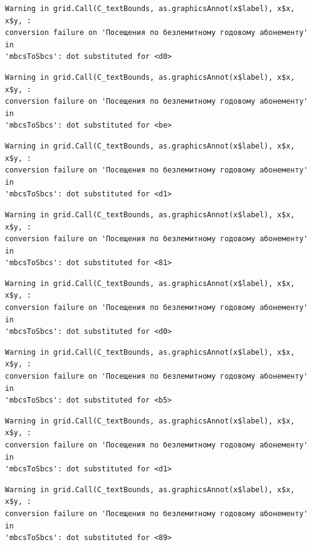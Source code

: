 \documentclass[
  letterpaper,
  DIV=11,
  numbers=noendperiod]{scrartcl}
\begin{document}
\begin{verbatim}
Warning in grid.Call(C_textBounds, as.graphicsAnnot(x$label), x$x, x$y, :
conversion failure on 'Посещения по безлемитному годовому абонементу' in
'mbcsToSbcs': dot substituted for <d0>
\end{verbatim}

\begin{verbatim}
Warning in grid.Call(C_textBounds, as.graphicsAnnot(x$label), x$x, x$y, :
conversion failure on 'Посещения по безлемитному годовому абонементу' in
'mbcsToSbcs': dot substituted for <be>
\end{verbatim}

\begin{verbatim}
Warning in grid.Call(C_textBounds, as.graphicsAnnot(x$label), x$x, x$y, :
conversion failure on 'Посещения по безлемитному годовому абонементу' in
'mbcsToSbcs': dot substituted for <d1>
\end{verbatim}

\begin{verbatim}
Warning in grid.Call(C_textBounds, as.graphicsAnnot(x$label), x$x, x$y, :
conversion failure on 'Посещения по безлемитному годовому абонементу' in
'mbcsToSbcs': dot substituted for <81>
\end{verbatim}

\begin{verbatim}
Warning in grid.Call(C_textBounds, as.graphicsAnnot(x$label), x$x, x$y, :
conversion failure on 'Посещения по безлемитному годовому абонементу' in
'mbcsToSbcs': dot substituted for <d0>
\end{verbatim}

\begin{verbatim}
Warning in grid.Call(C_textBounds, as.graphicsAnnot(x$label), x$x, x$y, :
conversion failure on 'Посещения по безлемитному годовому абонементу' in
'mbcsToSbcs': dot substituted for <b5>
\end{verbatim}

\begin{verbatim}
Warning in grid.Call(C_textBounds, as.graphicsAnnot(x$label), x$x, x$y, :
conversion failure on 'Посещения по безлемитному годовому абонементу' in
'mbcsToSbcs': dot substituted for <d1>
\end{verbatim}

\begin{verbatim}
Warning in grid.Call(C_textBounds, as.graphicsAnnot(x$label), x$x, x$y, :
conversion failure on 'Посещения по безлемитному годовому абонементу' in
'mbcsToSbcs': dot substituted for <89>
\end{verbatim}
\end{document}
